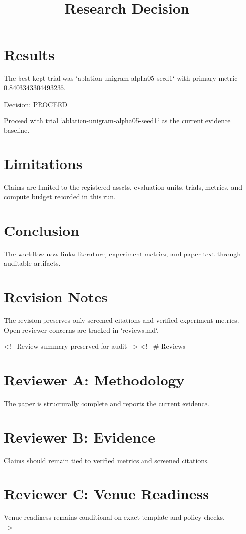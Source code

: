 \documentclass{article}
\begin{document}
\section{Results}
The best kept trial was `ablation-unigram-alpha05-seed1` with primary metric 0.8403343304493236.
\title{Research Decision}
\maketitle

Decision: PROCEED

Proceed with trial `ablation-unigram-alpha05-seed1` as the current evidence baseline.

\section{Limitations}
Claims are limited to the registered assets, evaluation units, trials, metrics, and compute budget recorded in this run.

\section{Conclusion}
The workflow now links literature, experiment metrics, and paper text through auditable artifacts.

\section{Revision Notes}
The revision preserves only screened citations and verified experiment metrics. Open reviewer concerns are tracked in `reviews.md`.

<!-- Review summary preserved for audit -->
<!-- \# Reviews

\section{Reviewer A: Methodology}
\noindent The paper is structurally complete and reports the current evidence.\\
\section{Reviewer B: Evidence}
\noindent Claims should remain tied to verified metrics and screened citations.\\
\section{Reviewer C: Venue Readiness}
\noindent Venue readiness remains conditional on exact template and policy checks.\\
 -->
\end{document}
